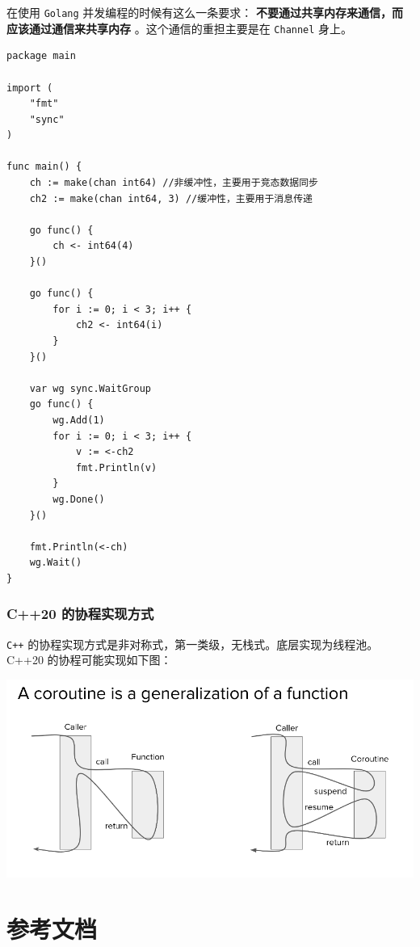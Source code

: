 \documentclass[UTF8]{ctexart}
\begin{document}
在使用 \texttt{Golang} 并发编程的时候有这么一条要求： \textbf{不要通过共享内存来通信，而应该通过通信来共享内存} 。这个通信的重担主要是在 \texttt{Channel} 身上。
\lstset{language=go,label= ,caption= ,captionpos=b,numbers=none}
\begin{lstlisting}
package main

import (
    "fmt"
    "sync"
)

func main() {
    ch := make(chan int64) //非缓冲性，主要用于竞态数据同步
    ch2 := make(chan int64, 3) //缓冲性，主要用于消息传递

    go func() {
        ch <- int64(4)
    }()

    go func() {
        for i := 0; i < 3; i++ {
            ch2 <- int64(i)
        }
    }()

    var wg sync.WaitGroup
    go func() {
        wg.Add(1)
        for i := 0; i < 3; i++ {
            v := <-ch2
            fmt.Println(v)
        }
        wg.Done()
    }()

    fmt.Println(<-ch)
    wg.Wait()
}
\end{lstlisting}

\subsubsection{C++20 的协程实现方式}
\label{sec:orgd740b2f}
\texttt{C++} 的协程实现方式是非对称式，第一类级，无栈式。底层实现为线程池。C++20 的协程可能实现如下图：

\begin{center}
\includegraphics[width=.9\linewidth]{./coroutine.png}
\end{center}

\section{参考文档}
\label{sec:orga25c1f4}
\end{document}
